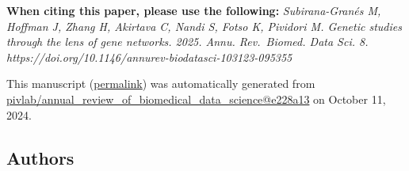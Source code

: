 { \textbf{When citing this paper, please use the following:}
\emph{Subirana-Granés M, Hoffman J, Zhang H, Akirtava C, Nandi S, Fotso K, Pividori M. Genetic studies through the lens of gene networks. 2025. Annu. Rev.~Biomed. Data Sci. 8. https://doi.org/10.1146/annurev-biodatasci-103123-095355}}

This manuscript
(\href{https://pivlab.github.io/annual_review_of_biomedical_data_science/v/e228a134341464b796d84ee5d23222a1f77ae665/}{permalink})
was automatically generated
from \href{https://github.com/pivlab/annual_review_of_biomedical_data_science/tree/e228a134341464b796d84ee5d23222a1f77ae665}{pivlab/annual\_review\_of\_biomedical\_data\_science@e228a13}
on October 11, 2024.

\hypertarget{authors}{%
\subsection{Authors}\label{authors}}

